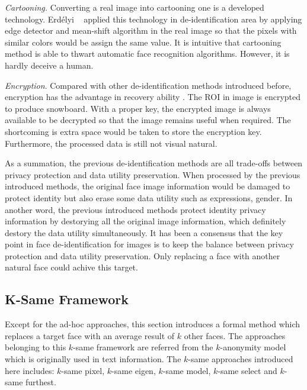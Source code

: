 	{\it Cartooning.} Converting a real image into cartooning one is 
	a developed technology. Erdélyi ~\cite{erdely14} applied this 
	technology in de-identification area by applying edge detector 
	and mean-shift algorithm in the real image so that the pixels 
	with similar colors would be assign the same value. It is intuitive 
	that cartooning method is able to thwart automatic face recognition 
	algorithms. However, it is hardly deceive a human. 

	{\it Encryption}. Compared with other de-identification methods 
	introduced before, encryption has the advantage in recovery ability 
	\cite{Boult05}. The ROI in image is encrypted to produce snowboard. 
	With a proper key, the encrypted image is always available to be 
	decrypted so that the image remains useful when required. The 
	shortcoming is extra space would be taken to store the encryption
	key. Furthermore, the processed data is still not visual natural. 

	As a summation, the previous de-identification methods are all trade-offs 
	between privacy protection and data utility preservation. When processed 
	by the previous introduced methods, the original face image information 
	would be damaged to protect identity but also erase some data utility such 
	as expressions, gender. In another word, the previous introduced methods 
	protect identity privacy information by destorying all the original image 
	information, which definitely destory the data utility simultaneously. 
  	It has been a consensus that the key point in face de-identification for
  	images is to keep the balance between privacy protection and data utility
  	preservation. Only replacing a face with another natural face could 
  	achive this target. 
  	

	\subsection{K-Same Framework}
	Except for the ad-hoc approaches, this section introduces a formal method
	which replaces a target face with an average result of $k$ other faces.
	The approaches belonging to this $k$-same framework are referred from the
	$k$-anonymity model which is originally used in text information. The 
	$k$-same approaches introduced here includes: $k$-same pixel, $k$-same eigen,
	$k$-same model, $k$-same select and $k$-same furthest.  

